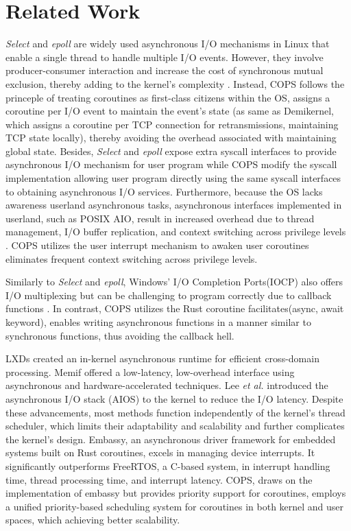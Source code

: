 \documentclass[conference]{IEEEtran}
\begin{document}
\section{Related Work}
\label{section: Related Work}

\textit{Select} and \textit{epoll} are widely used asynchronous I/O mechanisms in Linux that enable a single thread to handle multiple I/O events. However, they involve producer-consumer interaction and increase the cost of synchronous mutual exclusion, thereby adding to the kernel's complexity \cite{Gammo2004ComparingAE}. Instead, COPS follows the princeple of treating coroutines as first-class citizens within the OS, assigns a coroutine per I/O event to maintain the event's state (as same as Demikernel\cite{zhang_demikernel_2021}, which assigns a coroutine per TCP connection for retransmissions, maintaining TCP state locally), thereby avoiding the overhead associated with maintaining global state. Besides, \textit{Select} and \textit{epoll} expose extra syscall interfaces to provide asynchronous I/O mechanism for user program while COPS modify the syscall implementation allowing user program directly using the same syscall interfaces to obtaining asynchronous I/O services. Furthermore, because the OS lacks awareness userland asynchronous tasks, asynchronous interfaces implemented in userland, such as POSIX AIO, result in increased overhead due to thread management, I/O buffer replication, and context switching across privilege levels \cite{jones2006boost}. COPS utilizes the user interrupt mechanism to awaken user coroutines eliminates frequent context switching across privilege levels. 

Similarly to \textit{Select} and \textit{epoll}, Windows' I/O Completion Ports(IOCP) \cite{alvinashcraft_io_2022} also offers I/O multiplexing but can be challenging to program correctly due to callback functions \cite{callbackhell}. In contrast, COPS utilizes the Rust coroutine facilitates(async, await keyword), enables writing asynchronous functions in a manner similar to synchronous functions, thus avoiding the callback hell.

LXDs \cite{narayanan2019lxds} created an in-kernel asynchronous runtime for efficient cross-domain processing. Memif \cite{lin2016memif} offered a low-latency, low-overhead interface using asynchronous and hardware-accelerated techniques. Lee \textit{et al.} \cite{lee2019asynchronous} introduced the asynchronous I/O stack (AIOS) to the kernel to reduce the I/O latency. Despite these advancements, most methods function independently of the kernel's thread scheduler, which limits their adaptability and scalability and further complicates the kernel's design. Embassy\cite{embassy}, an asynchronous driver framework for embedded systems built on Rust coroutines, excels in managing device interrupts. It significantly outperforms FreeRTOS, a C-based system, in interrupt handling time, thread processing time, and interrupt latency. COPS, draws on the implementation of embassy but provides priority support for coroutines, employs a unified priority-based scheduling system for coroutines in both kernel and user spaces, which achieving better scalability.
\end{document}
